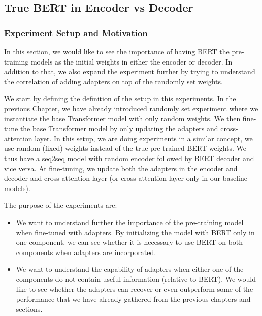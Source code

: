 
\subsection{True BERT in Encoder vs Decoder}
\label{sec:pospre}
\subsubsection{Experiment Setup and Motivation}
In this section, we would like to see the importance of having BERT the pre-training models as the initial weights in either the encoder or decoder. In addition to that, we also expand the experiment further by trying to understand the correlation of adding adapters on top of the randomly set weights.

We start by defining the definition of the setup in this experiments. In the previous Chapter, we have already introduced randomly set experiment where we instantiate the base Transformer model with only random weights. We then fine-tune the base Transformer model by only updating the adapters and cross-attention layer. In this setup, we are doing experiments in a similar concept, we use random (fixed) weights instead of the true pre-trained BERT weights. We thus have a seq2seq model with random encoder followed by BERT decoder and vice versa. At fine-tuning, we update both the adapters in the encoder and decoder and cross-attention layer (or cross-attention layer only in our baseline models).

The purpose of the experiments are:
\begin{itemize}
    \item We want to understand further the importance of the pre-training model when fine-tuned with adapters. By initializing the model with BERT only in one component, we can see whether it is necessary to use BERT on both components when adapters are incorporated.
    \item We want to understand the capability of adapters when either one of the components do not contain useful information (relative to BERT). We would like to see whether the adapters can recover or even outperform some of the performance that we have already gathered from the previous chapters and sections.
\end{itemize}

